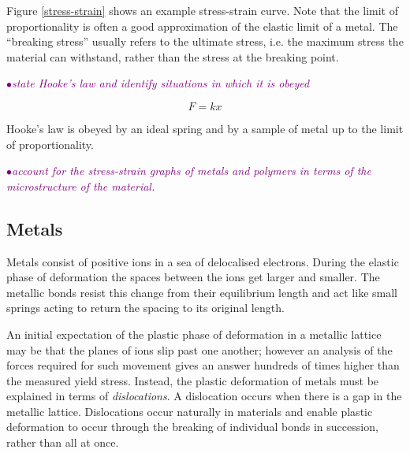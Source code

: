 \documentclass[a4paper,11pt,twoside]{memoir}
\newcounter{spec}[chapter]
\newcommand{\spec}[1]{\Needspace{5\baselineskip}\textcolor{purple}{$\bullet$\hspace{0.5cm}\textit{#1}}}
\begin{document}
Figure \ref{stress-strain} shows an example stress-strain curve. Note that the limit of proportionality is often a good approximation of the elastic limit of a metal. The ``breaking stress'' usually refers to the ultimate stress, i.e. the maximum stress the material can withstand, rather than the stress at the breaking point.

\spec{state Hooke's law and identify situations in which it is obeyed}

\[ F = kx \]

Hooke's law is obeyed by an ideal spring and by a sample of metal up to the limit of proportionality.

\spec{account for the stress-strain graphs of metals and polymers in terms of the microstructure of the material.}

\subsection{Metals}
Metals consist of positive ions in a sea of delocalised electrons. During the elastic phase of deformation the spaces between the ions get larger and smaller. The metallic bonds resist this change from their equilibrium length and act like small springs acting to return the spacing to its original length.

An initial expectation of the plastic phase of deformation in a metallic lattice may be that the planes of ions slip past one another; however an analysis of the forces required for such movement gives an answer hundreds of times higher than the measured yield stress. Instead, the plastic deformation of metals must be explained in terms of \emph{dislocations}. A dislocation occurs when there is a gap in the metallic lattice. Dislocations occur naturally in materials and enable plastic deformation to occur through the breaking of individual bonds in succession, rather than all at once.
\end{document}
